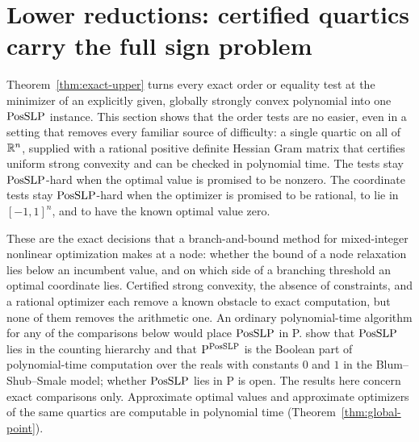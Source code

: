 \section{Lower reductions: certified quartics carry the full sign problem}
\label{sec:reductions}

Theorem~\ref{thm:exact-upper} turns every exact order or equality test at
the minimizer of an explicitly given, globally strongly convex polynomial
into one $\mathrm{PosSLP}$ instance. This section shows that the order tests are no
easier, even in a setting that removes every familiar source of difficulty:
a single quartic on all of $\mathbb R^n$, supplied with a rational positive definite
Hessian Gram matrix that certifies uniform strong convexity and can be checked
in polynomial time. The tests stay $\mathrm{PosSLP}$-hard when the optimal value is
promised to be nonzero. The coordinate tests stay $\mathrm{PosSLP}$-hard when the
optimizer is promised to be rational, to lie in $[-1,1]^n$, and to have the
known optimal value zero.

These are the exact decisions that a branch-and-bound method for
mixed-integer nonlinear optimization makes at a node: whether the bound of a
node relaxation lies below an incumbent value, and on which side of a
branching threshold an optimal coordinate lies. Certified strong convexity,
the absence of constraints, and a rational optimizer each remove a known
obstacle to exact computation, but none of them removes the arithmetic one.
An ordinary polynomial-time algorithm for any of the comparisons below would
place $\mathrm{PosSLP}$ in P. \citet{AllenderEtAl2009} show that $\mathrm{PosSLP}$ lies in the
counting hierarchy and that $\mathrm{P}^{\mathrm{PosSLP}}$ is the Boolean part of
polynomial-time computation over the reals with constants $0$ and $1$ in the
Blum--Shub--Smale model; whether $\mathrm{PosSLP}$ lies in P is open. The results here
concern exact comparisons only. Approximate optimal values and approximate
optimizers of the same quartics are computable in polynomial time
(Theorem~\ref{thm:global-point}).

